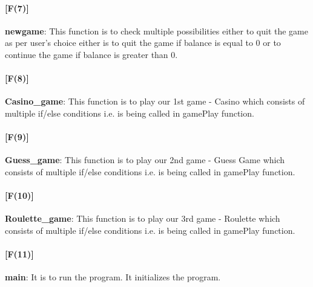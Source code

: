 \documentclass[]{article}
\begin{document}
\paragraph{[F(7)]}\textbf{newgame}:  This function is to check multiple possibilities either to quit the game as per user's choice either is to quit the game if balance is equal to 0 or to continue the game if balance is greater than 0.

\paragraph{[F(8)]}\textbf{Casino\_game}:  This function is to play our 1st game - Casino which consists of multiple if/else conditions i.e. is being called in gamePlay function.

\paragraph{[F(9)]}\textbf{Guess\_game}:  This function is to play our 2nd game - Guess Game which consists of multiple if/else conditions i.e. is being called in gamePlay function.

\paragraph{[F(10)]}\textbf{Roulette\_game}:  This function is to play our 3rd game - Roulette which consists of multiple if/else conditions i.e. is being called in gamePlay function.

\paragraph{[F(11)]}\textbf{main}: It is to run the program. It initializes the program.

\pagebreak
\thispagestyle{restpage}
\end{document}
